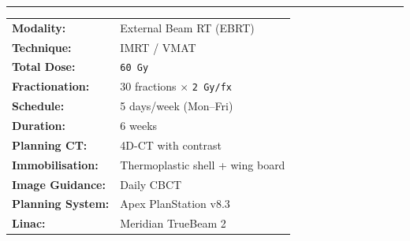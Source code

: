 \documentclass[11pt,a4paper]{scrartcl}
\newcommand{\sectionrule}{%
  \par\vspace{2pt}\noindent%
  {\color{TealAccent}\rule{\linewidth}{1.5pt}}\par\par%
  \vspace{4pt}%
}
\newcommand{\dose}[1]{\texttt{\textcolor{TealAccent}{#1}}}
\begin{document}

\sectionrule

\noindent
\begin{minipage}[t]{0.475\linewidth}
  \begin{tcolorbox}[protocolbox, title={\faRulerCombined\quad Treatment Parameters}, breakable=false]
    \footnotesize
    \begin{tabular}{@{} l p{4.5cm} @{}}
      \textbf{Modality:}        & External Beam RT (EBRT) \\[2pt]
      \textbf{Technique:}       & IMRT / VMAT \\[2pt]
      \textbf{Total Dose:}      & \dose{60\,Gy} \\[2pt]
      \textbf{Fractionation:}   & 30 fractions $\times$ \dose{2\,Gy/fx} \\[2pt]
      \textbf{Schedule:}        & 5 days/week (Mon--Fri) \\[2pt]
      \textbf{Duration:}        & 6 weeks \\[2pt]
      \textbf{Planning CT:}     & 4D-CT with contrast \\[2pt]
      \textbf{Immobilisation:}  & Thermoplastic shell + wing board \\[2pt]
      \textbf{Image Guidance:}  & Daily CBCT \\[2pt]
      \textbf{Planning System:} & Apex PlanStation v8.3 \\[2pt]
      \textbf{Linac:}           & Meridian TrueBeam 2 \\[2pt]
    \end{tabular}
  \end{tcolorbox}
\end{minipage}%
\hfill
\end{document}
